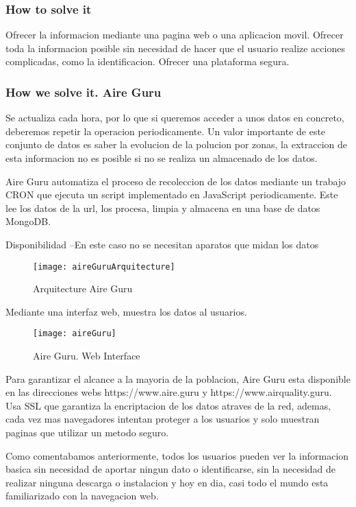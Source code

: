\subsubsection{How to solve it} 
Ofrecer la informacion mediante una pagina web o una aplicacion movil. Ofrecer toda la informacion posible sin necesidad de
hacer que el usuario realize acciones complicadas, como la identificacion.
Ofrecer una plataforma segura.
\subsubsection{How we solve it. Aire Guru} 
Se actualiza cada hora, por lo que si queremos acceder a unos datos en concreto, deberemos repetir la operacion periodicamente.
Un valor importante de este conjunto de datos es saber la evolucion de la polucion por zonas, la extraccion de esta informacion no es posible
si no se realiza un almacenado de los datos.

Aire Guru automatiza el proceso de recoleccion de los datos mediante un trabajo CRON que ejecuta un script implementado en JavaScript periodicamente. Este lee 
los datos de la url, los procesa, limpia y almacena en una base de datos MongoDB.

Disponibilidad --En este caso no se necesitan aparatos que midan los datos
\begin{figure}[ht]
    \centering
    \texttt{[image: aireGuruArquitecture]}
    \caption{Arquitecture Aire Guru}
\end{figure}

Mediante una interfaz web, muestra los datos al usuarios.

\begin{figure}[ht]
    \centering
    \texttt{[image: aireGuru]}
    \caption{Aire Guru. Web Interface}
\end{figure}
Para garantizar el alcance a la mayoria de la poblacion, Aire Guru esta disponible en las direcciones webs https://www.aire.guru y https://www.airquality.guru.
Usa SSL que garantiza la encriptacion de los datos atraves de la red, ademas, cada vez mas navegadores intentan proteger a los usuarios y
solo muestran paginas que utilizar un metodo seguro. 

Como comentabamos anteriormente, todos los usuarios pueden ver la informacion basica sin necesidad de aportar ningun dato o identificarse, sin la necesidad de 
realizar ninguna descarga o instalacion y hoy en dia, casi todo el mundo esta familiarizado con la navegacion web.

